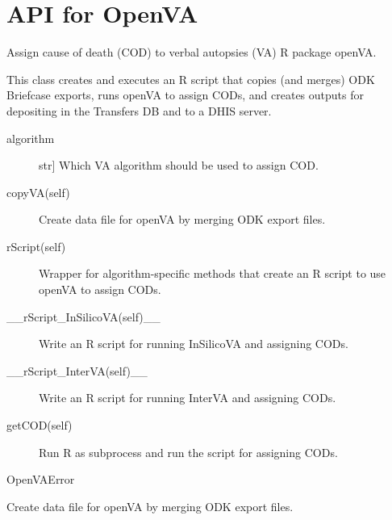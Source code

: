 \documentclass[letterpaper,12pt,english]{sphinxmanual}
\begin{document}
\section{API for OpenVA}
\label{\detokenize{help:api-for-openva}}

\begin{fulllineitems}
\label{\detokenize{help:openVA.OpenVA}}
Assign cause of death (COD) to verbal autopsies (VA) R package openVA.

This class creates and executes an R script that copies (and merges) ODK Briefcase
exports, runs openVA to assign CODs, and creates outputs for depositing in
the Transfers DB and to a DHIS server.
\begin{description}
\item[{algorithm}] \leavevmode{[}str{]}
Which VA algorithm should be used to assign COD.

\end{description}
\begin{description}
\item[{copyVA(self)}] \leavevmode
Create data file for openVA by merging ODK export files.

\item[{rScript(self)}] \leavevmode
Wrapper for algorithm-specific methods that create an R script to use
openVA to assign CODs.

\item[{\_\_rScript\_InSilicoVA(self)\_\_}] \leavevmode
Write an R script for running InSilicoVA and assigning CODs.

\item[{\_\_rScript\_InterVA(self)\_\_}] \leavevmode
Write an R script for running InterVA and assigning CODs.

\item[{getCOD(self)}] \leavevmode
Run R as subprocess and run the script for assigning CODs.

\end{description}

OpenVAError

\begin{fulllineitems}
\label{\detokenize{help:openVA.OpenVA.copyVA}}
Create data file for openVA by merging ODK export files.


\end{fulllineitems}
\end{fulllineitems}
\end{document}
